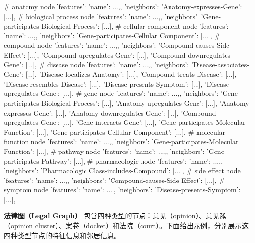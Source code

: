 \documentclass[11pt,UTF8,fontset=fandol]{ctexart}
\begin{document}
\begin{code}
# anatomy node
{
    'features': {'name': ...,},
    'neighbors': {
        'Anatomy-expresses-Gene': [...],
        }
}
# biological process node
{
    'features': {'name': ...,},
    'neighbors': {
        'Gene-participates-Biological Process': [...],
        }
}
# cellular component node
{
    'features': {'name': ...,},
    'neighbors': {
        'Gene-participates-Cellular Component': [...],
        }
}
# compound node
{
    'features': {'name': ...,},
    'neighbors': {
        'Compound-causes-Side Effect': [...],
        'Compound-upregulates-Gene': [...],
        'Compound-downregulates-Gene': [...],
        }
}
# disease node
{
    'features': {'name': ...,},
    'neighbors': {
        'Disease-associates-Gene': [...],
        'Disease-localizes-Anatomy': [...],
        'Compound-treats-Disease': [...],
        'Disease-resembles-Disease': [...],
        'Disease-presents-Symptom': [...],
        'Disease-upregulates-Gene': [...],
        }
}
# gene node
{
    'features': {'name': ...,},
    'neighbors': {
        'Gene-participates-Biological Process': [...],
        'Anatomy-upregulates-Gene': [...],
        'Anatomy-expresses-Gene': [...],
        'Anatomy-downregulates-Gene': [...],
        'Compound-upregulates-Gene': [...],
        'Gene-interacts-Gene': [...],
        'Gene-participates-Molecular Function': [...],
        'Gene-participates-Cellular Component': [...],
        }
}
# molecular function node
{
    'features': {'name': ...,},
    'neighbors': {
        'Gene-participates-Molecular Function': [...],
        }
}
# pathway node
{
    'features': {'name': ...,},
    'neighbors': {
        'Gene-participates-Pathway': [...],
        }
}
# pharmacologic node
{
    'features': {'name': ...,},
    'neighbors': {
        'Pharmacologic Class-includes-Compound': [...],
        }
}
# side effect node
{
    'features': {'name': ...,},
    'neighbors': {
        'Compound-causes-Side Effect': [...],
        }
}
# symptom node
{
    'features': {'name': ...,},
    'neighbors': {
        'Disease-presents-Symptom': [...],
        }
}
\end{code}

\textbf{法律图（Legal Graph）} 包含四种类型的节点：意见（opinion）、意见簇（opinion cluster）、案卷（docket）和法院（court）。下面给出示例，分别展示这四种类型节点的特征信息和邻居信息。
\end{document}
